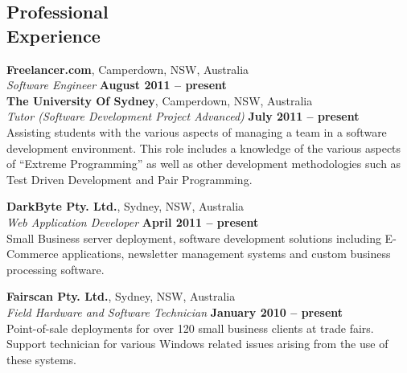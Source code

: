 \documentclass[margin,line]{resume}
\begin{document}
\begin{resume}



    \section{\mysidestyle Professional\\Experience}
    \textbf{Freelancer.com}, Camperdown, NSW, Australia \vspace{2mm}\\\vspace{1mm}%
    \textsl{Software Engineer} \hfill \textbf{August 2011 -- present}\\
   
    \textbf{The University Of Sydney}, Camperdown, NSW, Australia \vspace{2mm}\\\vspace{1mm}%
    \textsl{Tutor (Software Development Project Advanced)} \hfill \textbf{July 2011 -- present}\\
    Assisting students with the various aspects of managing a team in a software development environment.
    This role includes a knowledge of the various aspects of ``Extreme Programming'' as well as other development
    methodologies such as Test Driven Development and Pair Programming.

    \textbf{DarkByte Pty. Ltd.}, Sydney, NSW, Australia \vspace{2mm}\\\vspace{1mm}%
    \textsl{Web Application Developer} \hfill \textbf{April 2011 -- present}\\
    Small Business server deployment, software development solutions including E-Commerce applications,
    newsletter management systems and custom business processing software.	

    \textbf{Fairscan Pty. Ltd.}, Sydney, NSW, Australia \vspace{2mm}\\\vspace{1mm}%
    \textsl{Field Hardware and Software Technician} \hfill \textbf{January 2010 -- present}\\
    Point-of-sale deployments for over 120 small business clients at trade fairs. Support technician for various Windows
    related issues arising from the use of these systems.


\end{resume}
\end{document}
